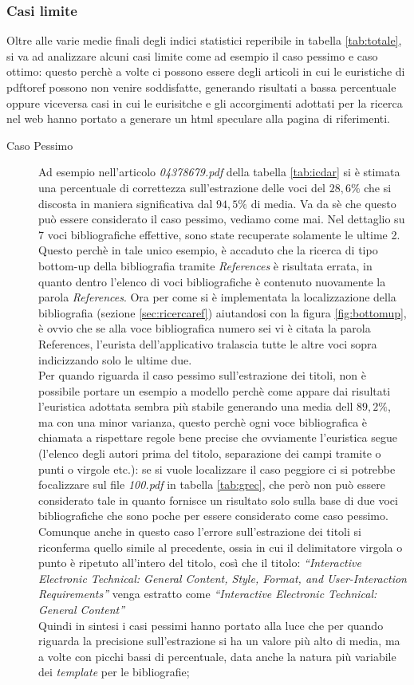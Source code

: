 \subsubsection{Casi limite}
Oltre alle varie medie finali degli indici statistici reperibile in tabella \ref{tab:totale}, si va ad analizzare alcuni casi limite come ad esempio il caso pessimo e caso ottimo: questo perchè a volte ci possono essere degli articoli in cui le euristiche di pdftoref possono non venire soddisfatte, generando risultati a bassa percentuale oppure viceversa casi in cui le eurisitche e gli accorgimenti adottati per la ricerca nel web hanno portato a generare un html speculare alla pagina di riferimenti.
\begin{description}

	\item[Caso Pessimo]Ad esempio nell'articolo \textit{04378679.pdf} della tabella \ref{tab:icdar} si è stimata una percentuale di correttezza sull'estrazione delle voci del $28,6\%$ che si discosta in maniera significativa dal $94,5\%$ di media. Va da sè che questo può essere considerato il caso pessimo, vediamo come mai. Nel dettaglio su 7 voci bibliografiche effettive, sono state recuperate solamente le ultime 2. Questo perchè in tale unico esempio, è accaduto che la ricerca di tipo bottom-up della bibliografia tramite \textit{References} è risultata errata, in quanto dentro l'elenco di voci bibliografiche è contenuto nuovamente la parola \textit{References}. Ora per come si è implementata la localizzazione della bibliografia (sezione \ref{sec:ricercaref}) aiutandosi con la figura \ref{fig:bottomup}, è ovvio che se alla voce bibliografica numero sei vi è citata la parola References, l'eurista dell'applicativo tralascia tutte le altre voci sopra indicizzando solo le ultime due.\\ Per quando riguarda il caso pessimo sull'estrazione dei titoli, non è possibile portare un esempio a modello perchè come appare dai risultati l'euristica adottata sembra più stabile generando una media dell $89,2\%$, ma con una minor varianza, questo perchè ogni voce bibliografica è chiamata a rispettare regole bene precise che ovviamente l'euristica segue (l'elenco degli autori prima del titolo, separazione dei campi tramite o punti o virgole etc.): se si vuole localizzare il caso peggiore ci si potrebbe focalizzare sul file \textit{100.pdf} in tabella \ref{tab:grec}, che però non può essere considerato tale in quanto fornisce un risultato solo sulla base di due voci bibliografiche che sono poche per essere considerato come caso pessimo. Comunque anche in questo caso l'errore sull'estrazione dei titoli si riconferma quello simile al precedente, ossia in cui il delimitatore virgola o punto è ripetuto all'intero del titolo, così che il titolo: \textit{``Interactive Electronic Technical: General Content, Style, Format, and User-Interaction Requirements''} venga estratto come \textit{``Interactive Electronic Technical: General Content''}\\ Quindi in sintesi i casi pessimi hanno portato alla luce che per quando riguarda la precisione sull'estrazione si ha un valore più alto di media, ma a volte con picchi bassi di percentuale, data anche la natura più variabile dei \textit{template} per le bibliografie; 
\end{description}

